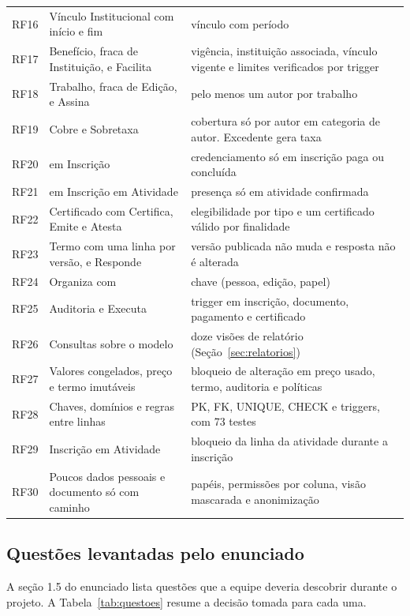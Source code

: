 \begin{longtable}{@{}l L{6.2cm} L{6.6cm}@{}}
RF16 & Vínculo Institucional com início e fim & vínculo com período\\
RF17 & Benefício, fraca de Instituição, e Facilita & vigência, instituição associada, vínculo vigente e limites verificados por trigger\\
RF18 & Trabalho, fraca de Edição, e Assina & pelo menos um autor por trabalho\\
RF19 & Cobre e Sobretaxa & cobertura só por autor em categoria de autor. Excedente gera taxa\\
RF20 &  em Inscrição & credenciamento só em inscrição paga ou concluída\\
RF21 &  em Inscrição em Atividade & presença só em atividade confirmada\\
RF22 & Certificado com Certifica, Emite e Atesta & elegibilidade por tipo e um certificado válido por finalidade\\
RF23 & Termo com uma linha por versão, e Responde & versão publicada não muda e resposta não é alterada\\
RF24 & Organiza com  & chave (pessoa, edição, papel)\\
RF25 & Auditoria e Executa & trigger em inscrição, documento, pagamento e certificado\\
RF26 & Consultas sobre o modelo & doze visões de relatório (Seção~\ref{sec:relatorios})\\
RF27 & Valores congelados, preço e termo imutáveis & bloqueio de alteração em preço usado, termo, auditoria e políticas\\
RF28 & Chaves, domínios e regras entre linhas & PK, FK, UNIQUE, CHECK e triggers, com 73 testes\\
RF29 & Inscrição em Atividade & bloqueio da linha da atividade durante a inscrição\\
RF30 & Poucos dados pessoais e documento só com caminho & papéis, permissões por coluna, visão mascarada e anonimização\\
\end{longtable}

\subsection{Questões levantadas pelo enunciado}

A seção 1.5 do enunciado lista questões que a equipe deveria descobrir durante o projeto. A Tabela~\ref{tab:questoes} resume a decisão tomada para cada uma.

